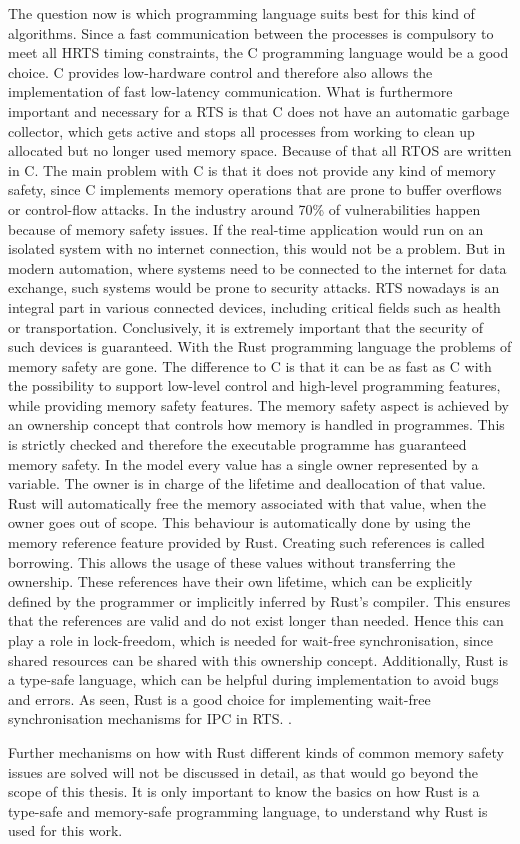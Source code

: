 The question now is which programming language suits best for this kind of algorithms. Since a fast communication between the processes is compulsory to meet all \ac{HRTS} timing constraints, the C programming language would be a good choice. C provides low-hardware control and therefore also allows the implementation of fast low-latency communication. What is furthermore important and necessary for a \ac{RTS} is that C does not have an automatic garbage collector, which gets active and stops all processes from working to clean up allocated but no longer used memory space. Because of that all \ac{RTOS} are written in C. The main problem with C is that it does not provide any kind of memory safety, since C implements memory operations that are prone to buffer overflows or control-flow attacks. In the industry around 70\% of vulnerabilities happen because of memory safety issues. If the real-time application would run on an isolated system with no internet connection, this would not be a problem. But in modern automation, where systems need to be connected to the internet for data exchange, such systems would be prone to security attacks. \ac{RTS} nowadays is an integral part in various connected devices, including critical fields such as health or transportation. Conclusively, it is extremely important that the security of such devices is guaranteed. With the Rust programming language the problems of memory safety are gone. The difference to C is that it can be as fast as C with the possibility to support low-level control and high-level programming features, while providing memory safety features. The memory safety aspect is achieved by an ownership concept that controls how memory is handled in programmes. This is strictly checked and therefore the executable programme has guaranteed memory safety. In the model every value has a single owner represented by a variable. The owner is in charge of the lifetime and deallocation of that value. Rust will automatically free the memory associated with that value, when the owner goes out of scope. This behaviour is automatically done by using the memory reference feature provided by Rust. Creating such references is called borrowing. This allows the usage of these values without transferring the ownership. These references have their own lifetime, which can be explicitly defined by the programmer or implicitly inferred by Rust's compiler. This ensures that the references are valid and do not exist longer than needed. Hence this can play a role in lock-freedom, which is needed for wait-free synchronisation, since shared resources can be shared with this ownership concept. Additionally, Rust is a type-safe language, which can be helpful during implementation to avoid bugs and errors. As seen, Rust is a good choice for implementing wait-free synchronisation mechanisms for \ac{IPC} in \ac{RTS}. \cite{xu2023rust, culic2022lowRust}. 

Further mechanisms on how with Rust different kinds of common memory safety issues are solved will not be discussed in detail, as that would go beyond the scope of this thesis. It is only important to know the basics on how Rust is a type-safe and memory-safe programming language, to understand why Rust is used for this work.